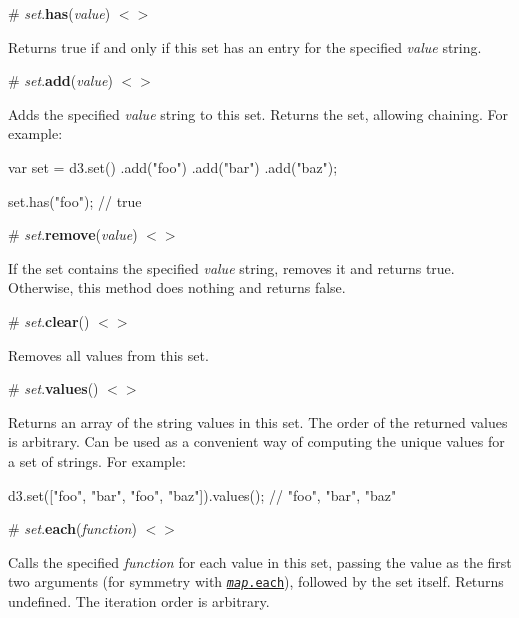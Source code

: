 \label{_set_has}%
\# {\itshape set}.{\bfseries has}({\itshape value}) \href{https://github.com/d3/d3-collection/blob/master/src/set.js#L9}{\tt $<$$>$}

Returns true if and only if this set has an entry for the specified {\itshape value} string.

\label{_set_add}%
\# {\itshape set}.{\bfseries add}({\itshape value}) \href{https://github.com/d3/d3-collection/blob/master/src/set.js#L10}{\tt $<$$>$}

Adds the specified {\itshape value} string to this set. Returns the set, allowing chaining. For example\+:


\begin{DoxyCode}
var set = d3.set()
    .add("foo")
    .add("bar")
    .add("baz");

set.has("foo"); // true
\end{DoxyCode}


\label{_set_remove}%
\# {\itshape set}.{\bfseries remove}({\itshape value}) \href{https://github.com/d3/d3-collection/blob/master/src/set.js#L15}{\tt $<$$>$}

If the set contains the specified {\itshape value} string, removes it and returns true. Otherwise, this method does nothing and returns false.

\label{_set_clear}%
\# {\itshape set}.{\bfseries clear}() \href{https://github.com/d3/d3-collection/blob/master/src/set.js#L16}{\tt $<$$>$}

Removes all values from this set.

\label{_set_values}%
\# {\itshape set}.{\bfseries values}() \href{https://github.com/d3/d3-collection/blob/master/src/set.js#L17}{\tt $<$$>$}

Returns an array of the string values in this set. The order of the returned values is arbitrary. Can be used as a convenient way of computing the unique values for a set of strings. For example\+:


\begin{DoxyCode}
d3.set(["foo", "bar", "foo", "baz"]).values(); // "foo", "bar", "baz"
\end{DoxyCode}


\label{_set_each}%
\# {\itshape set}.{\bfseries each}({\itshape function}) \href{https://github.com/d3/d3-collection/blob/master/src/set.js#L20}{\tt $<$$>$}

Calls the specified {\itshape function} for each value in this set, passing the value as the first two arguments (for symmetry with \href{#map_each}{\tt {\itshape map}.each}), followed by the set itself. Returns undefined. The iteration order is arbitrary.

